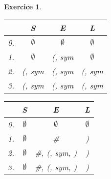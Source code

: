 \documentclass{article}
\theoremstyle{plain}
\newtheorem{exo}{Exercice}%
\begin{document}
\begin{exo}
\begin{enumerate}
  \begin{table}
    \begin{subtable}[c]{0.5\textwidth}
      \centering
        \begin{tabular}{l|c|c|c}
            & S & E & L \\
            \hline
          0. & $\emptyset$ & $\emptyset$ & $\emptyset$ \\
          1. & $\emptyset$ & (, sym & $\emptyset$ \\
          2. & (, sym & (, sym & (, sym \\
          3. & (, sym & (, sym & (, sym \\
        \end{tabular}
    \end{subtable}
    \begin{subtable}[c]{0.5\textwidth}
      \centering
        \begin{tabular}{l|c|c|c}
            & S & E & L \\
            \hline
          0. & $\emptyset$ & $\emptyset$ & $\emptyset$ \\
          1. & $\emptyset$ & \# & ) \\
          2. & $\emptyset$ & \#, (, sym, ) & ) \\
          3. & $\emptyset$ & \#, (, sym, ) & ) \\
        \end{tabular}
    \end{subtable}
  \end{table}
    
\end{enumerate}
\end{exo}
\end{document}
